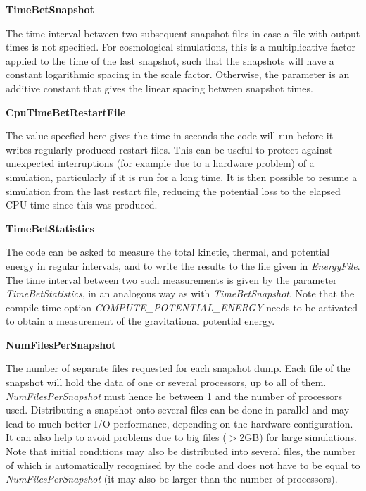 \begin{DoxyItemize}
\item {\bfseries \-Time\-Bet\-Snapshot} \par
 \-The time interval between two subsequent snapshot files in case a file with output times is not specified. \-For cosmological simulations, this is a multiplicative factor applied to the time of the last snapshot, such that the snapshots will have a constant logarithmic spacing in the scale factor. \-Otherwise, the parameter is an additive constant that gives the linear spacing between snapshot times.
\end{DoxyItemize}


\begin{DoxyItemize}
\item {\bfseries \-Cpu\-Time\-Bet\-Restart\-File} \par
 \-The value specfied here gives the time in seconds the code will run before it writes regularly produced restart files. \-This can be useful to protect against unexpected interruptions (for example due to a hardware problem) of a simulation, particularly if it is run for a long time. \-It is then possible to resume a simulation from the last restart file, reducing the potential loss to the elapsed \-C\-P\-U-\/time since this was produced.
\end{DoxyItemize}


\begin{DoxyItemize}
\item {\bfseries \-Time\-Bet\-Statistics} \par
 \-The code can be asked to measure the total kinetic, thermal, and potential energy in regular intervals, and to write the results to the file given in {\itshape \-Energy\-File\/}. \-The time interval between two such measurements is given by the parameter {\itshape \-Time\-Bet\-Statistics\/}, in an analogous way as with {\itshape \-Time\-Bet\-Snapshot\/}. \-Note that the compile time option {\itshape \-C\-O\-M\-P\-U\-T\-E\-\_\-\-P\-O\-T\-E\-N\-T\-I\-A\-L\-\_\-\-E\-N\-E\-R\-G\-Y\/} needs to be activated to obtain a measurement of the gravitational potential energy.
\end{DoxyItemize}


\begin{DoxyItemize}
\item {\bfseries \-Num\-Files\-Per\-Snapshot} \par
 \-The number of separate files requested for each snapshot dump. \-Each file of the snapshot will hold the data of one or several processors, up to all of them. {\itshape \-Num\-Files\-Per\-Snapshot\/} must hence lie between 1 and the number of processors used. \-Distributing a snapshot onto several files can be done in parallel and may lead to much better \-I/\-O performance, depending on the hardware configuration. \-It can also help to avoid problems due to big files ($>$2\-G\-B) for large simulations. \-Note that initial conditions may also be distributed into several files, the number of which is automatically recognised by the code and does not have to be equal to {\itshape \-Num\-Files\-Per\-Snapshot\/} (it may also be larger than the number of processors).
\end{DoxyItemize}


